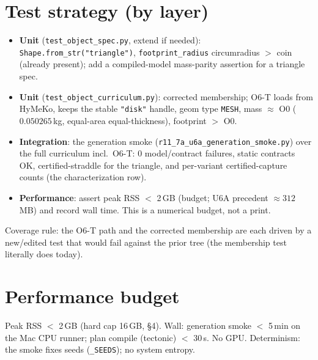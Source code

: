 \documentclass[11pt]{article}
\begin{document}
\section{Test strategy (by layer)}
\begin{itemize}[nosep]
  \item \textbf{Unit} (\texttt{test\_object\_spec.py}, extend if needed): \texttt{Shape.from\_str("triangle")},
    \texttt{footprint\_radius} circumradius $>$ coin (already present); add a compiled-model mass-parity
    assertion for a triangle spec.
  \item \textbf{Unit} (\texttt{test\_object\_curriculum.py}): corrected membership; O6-T loads from HyMeKo,
    keeps the stable \texttt{"disk"} handle, geom type \texttt{MESH}, mass $\approx$ O0
    ($0.050265$\,kg, equal-area equal-thickness), footprint $>$ O0.
  \item \textbf{Integration}: the generation smoke (\texttt{r11\_7a\_u6a\_generation\_smoke.py}) over the
    full curriculum incl.\ O6-T: 0 model/contract failures, static contracts OK, certified-straddle for
    the triangle, and per-variant certified-capture counts (the characterization row).
  \item \textbf{Performance}: assert peak RSS $<$ 2\,GB (budget; U6A precedent $\approx 312$\,MB) and
    record wall time. This is a numerical budget, not a print.
\end{itemize}
Coverage rule: the O6-T path and the corrected membership are each driven by a new/edited test that
would fail against the prior tree (the membership test literally does today).

\section{Performance budget}
Peak RSS $<$ 2\,GB (hard cap 16\,GB, \S4). Wall: generation smoke $<$ 5\,min on the Mac CPU runner;
plan compile (tectonic) $<$ 30\,s. No GPU. Determinism: the smoke fixes seeds
(\texttt{\_SEEDS}); no system entropy.
\end{document}
